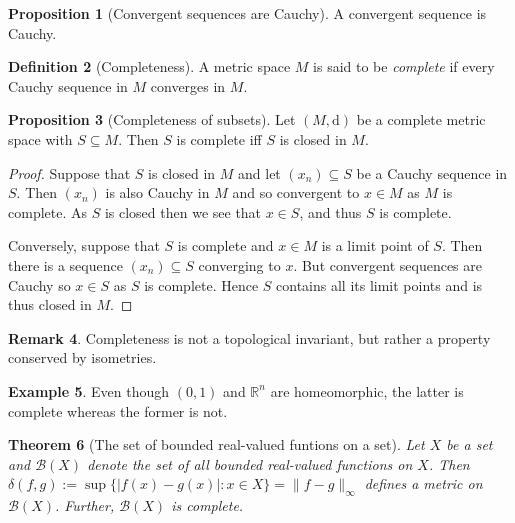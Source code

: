 \documentclass[10pt,fleqn]{article}
\newcommand{\met}{\mathrm{d}}
\newcommand{\reals}{\mathbb{R}}
\theoremstyle{definition} \newtheorem{defn}{Definition}[section]
\theoremstyle{plain}      \newtheorem{thm}[defn]{Theorem}
\theoremstyle{definition} \newtheorem{prop}[defn]{Proposition}
\theoremstyle{definition} \newtheorem{cor}[defn]{Corollary}
\theoremstyle{definition} \newtheorem{ex}[defn]{Example}
\theoremstyle{definition} \newtheorem{rem}[defn]{Remark}
\begin{document}
\begin{prop}[Convergent sequences are Cauchy]
    A convergent sequence is Cauchy.
\end{prop}

\begin{defn}[Completeness]
    A metric space $M$ is said to be \emph{complete} if every Cauchy sequence in $M$ converges in $M$.
\end{defn}

\begin{prop}[Completeness of subsets]
    Let $(M,\met)$ be a complete metric space with $S\subseteq M$.
    Then $S$ is complete iff $S$ is closed in $M$.
\end{prop}

\begin{proof}
    Suppose that $S$ is closed in $M$ and let $(x_n)\subseteq S$ be a Cauchy sequence in $S$.
    Then $(x_n)$ is also Cauchy in $M$ and so convergent to $x\in M$ as $M$ is complete.
    As $S$ is closed then we see that $x\in S$, and thus $S$ is complete.

    Conversely, suppose that $S$ is complete and $x\in M$ is a limit point of $S$.
    Then there is a sequence $(x_n)\subseteq S$ converging to $x$.
    But convergent sequences are Cauchy so $x\in S$ as $S$ is complete.
    Hence $S$ contains all its limit points and is thus closed in $M$.
\end{proof}

\begin{rem}
    Completeness is not a topological invariant, but rather a property conserved by isometries.
\end{rem}

\begin{ex}
    Even though $(0,1)$ and $\reals^n$ are homeomorphic, the latter is complete whereas the former is not.
\end{ex}


\begin{thm}[The set of bounded real-valued funtions on a set]\label{bounded-fns-complete}
    Let $X$ be a set and $\mathcal{B}(X)$ denote the set of all bounded real-valued functions on $X$.
    Then $\delta(f,g):=\sup\{|f(x)-g(x)|\colon x\in X\}=\|f-g\|_{\infty}$ defines a metric on $\mathcal{B}(X)$.
    Further, $\mathcal{B}(X)$ is complete.
\end{thm}
\end{document}
